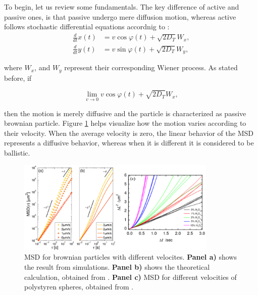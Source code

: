 To begin, let us review some fundamentals. The key difference of active and passive ones, is that passive undergo mere diffusion motion, whereas active follows stochastic differential equations accordnig to \cite{volpe2014simulation}:
\begin{align}
  \frac{d}{dt}x(t) &= v\cos{\varphi(t)} + \sqrt{2D_T}W_x,\\
  \frac{d}{dt}y(t) &= v\sin{\varphi(t)} + \sqrt{2D_T}W_y,
  \label{eq:activestochasticequation}
\end{align}

where $W_x$, and $W_y$ represent their corresponding Wiener process. As stated before, if 

\begin{equation}
  \lim_{v \to 0}  v\cos{\varphi(t)} + \sqrt{2D_T}W_x,
  \label{eq:limitofvelocity}
\end{equation}

then the motion is merely diffusive and the particle is characterized as passive brownian particle. Figure \ref{fig:msddifferentvelocities} helps visualize how  the motion varies according to their velocity. When the average velocity is zero, the linear behavior of the MSD represents a diffusive behavior, whereas when it is different it is considered to be ballistic. 

\begin{figure}[h]
  \begin{center}
    \includegraphics[width=0.85\textwidth]{figures/msdmicroscopicagents.pdf}
  \end{center}
  \caption[MSD for brownian particles]{MSD for brownian particles with different velocites. \textbf{Panel a)} shows the result from simulations. \textbf{Panel b)} shows the theoretical calculation, obtained from \cite{volpe2014simulation}. \textbf{Panel c)} MSD for different velocities of polystyren spheres, obtained from \cite{howse2007self}.}\label{fig:msddifferentvelocities}
\end{figure}


